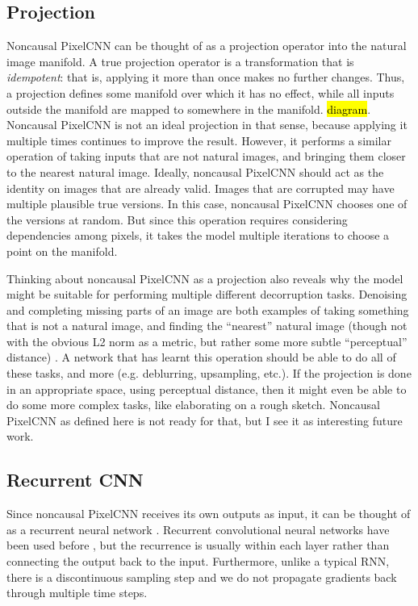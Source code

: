 \documentclass[11pt, a4paper]{book}
\newcommand{\nquote}[1]{``{#1}''}
\begin{document}
\subsection{Projection}

Noncausal PixelCNN can be thought of as a projection operator into the natural image manifold. A true projection operator is a transformation that is \emph{idempotent}: that is, applying it more than once makes no further changes. Thus, a projection defines some manifold over which it has no effect, while all inputs outside the manifold are mapped to somewhere in the manifold. \hl{diagram}. Noncausal PixelCNN is not an ideal projection in that sense, because applying it multiple times continues to improve the result. However, it performs a similar operation of taking inputs that are not natural images, and bringing them closer to the nearest natural image. Ideally, noncausal PixelCNN should act as the identity on images that are already valid. Images that are corrupted may have multiple plausible true versions. In this case, noncausal PixelCNN chooses one of the versions at random. But since this operation requires considering dependencies among pixels, it takes the model multiple iterations to choose a point on the manifold.

Thinking about noncausal PixelCNN as a projection also reveals why the model might be suitable for performing multiple different decorruption tasks. Denoising and completing missing parts of an image are both examples of taking something that is not a natural image, and finding the \nquote{nearest} natural image (though not with the obvious L2 norm as a metric, but rather some more subtle \nquote{perceptual} distance) \citep{imageinpainting}. A network that has learnt this operation should be able to do all of these tasks, and more (e.g. deblurring, upsampling, etc.). If the projection is done in an appropriate space, using perceptual distance, then it might even be able to do some more complex tasks, like elaborating on a rough sketch. Noncausal PixelCNN as defined here is not ready for that, but I see it as interesting future work.

\subsection{Recurrent CNN}

Since noncausal PixelCNN receives its own outputs as input, it can be thought of as a recurrent neural network \citep{??}. Recurrent convolutional neural networks have been used before \citep{??,??}, but the recurrence is usually within each layer rather than connecting the output back to the input. Furthermore, unlike a typical RNN, there is a discontinuous sampling step and we do not propagate gradients back through multiple time steps.
\end{document}
